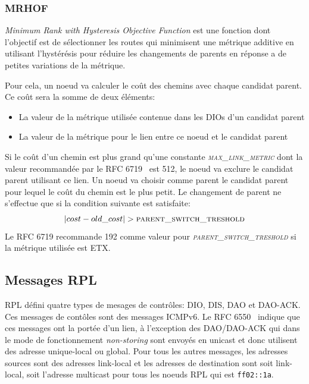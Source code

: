     \subsubsection*{MRHOF}%
            \textit{Minimum Rank with Hysteresis Objective Function} est une fonction dont l'objectif est de sélectionner les routes qui minimisent une métrique additive en utilisant l'hystérésis
            pour réduire les changements de parents en réponse a de petites variations de la métrique.
            
            Pour cela, un noeud va calculer le coût des chemins avec chaque candidat parent. Ce coût sera la somme de deux éléments:
            \begin{itemize}
                \item La valeur de la métrique utilisée contenue dans les DIOs d'un candidat parent
                \item La valeur de la métrique pour le lien entre ce noeud et le candidat parent
            \end{itemize}
            Si le coût d'un chemin est plus grand qu'une constante \textsl{\textsc{max\_link\_metric}} dont la valeur recommandée par le RFC 6719~\cite{rfc:mrhof} est 512,
            le noeud va exclure le candidat parent utilisant ce lien.
            Un noeud va choisir comme parent le candidat parent pour lequel le coût du chemin est le plus petit. Le changement de parent ne s'effectue que si la condition suivante est satisfaite:
            \[ |cost-old\_cost| > \textsc{parent\_switch\_treshold} \]
            Le RFC 6719 recommande 192 comme valeur pour \textsl{\textsc{parent\_switch\_treshold}} si la métrique utilisée est ETX.

\subsection*{Messages RPL}
    RPL défini quatre types de mesages de contrôles: DIO, DIS, DAO et DAO-ACK. Ces messages de contôles sont des messages ICMPv6. Le RFC 6550~\cite{rfc:rpl} indique que ces messages ont la portée d'un lien, à l'exception des DAO/DAO-ACK qui dans le mode de fonctionnement \textit{non-storing} sont envoyés en unicast et donc utilisent des adresse unique-local ou global. Pour tous les autres messages, les adresses sources sont des adresses link-local et les adresses de destination sont soit link-local, soit l'adresse multicast pour tous les noeuds RPL qui est \texttt{ff02::1a}.

